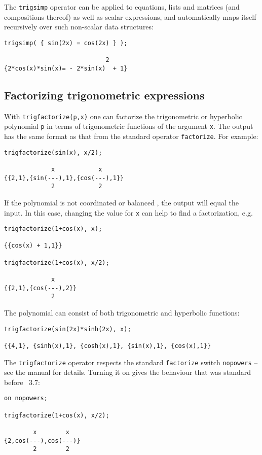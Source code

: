 The \texttt{trigsimp} operator can be applied to equations, lists and
matrices (and compositions thereof) as well as scalar expressions, and
automatically maps itself recursively over such non-scalar data
structures:
\begin{verbatim}
trigsimp( { sin(2x) = cos(2x) } );

                            2
{2*cos(x)*sin(x)= - 2*sin(x)  + 1}
\end{verbatim}


\subsection{Factorizing trigonometric expressions}

With \texttt{trigfactorize(p,x)} one can factorize the trigonometric
or hyperbolic polynomial \texttt{p} in terms of trigonometric
functions of the argument \texttt{x}.  The output has the same format
as that from the standard \REDUCE{} operator \texttt{factorize}.  For
example:
\begin{verbatim}
trigfactorize(sin(x), x/2);

             x            x
{{2,1},{sin(---),1},{cos(---),1}}
             2            2
\end{verbatim}
If the polynomial is not coordinated or balanced \cite{art}, the
output will equal the input.  In this case, changing the value for
\texttt{x} can help to find a factorization, e.g.
\begin{verbatim}
trigfactorize(1+cos(x), x);

{{cos(x) + 1,1}}

trigfactorize(1+cos(x), x/2);

             x
{{2,1},{cos(---),2}}
             2
\end{verbatim}
The polynomial can consist of both trigonometric and hyperbolic functions:
\begin{verbatim}
trigfactorize(sin(2x)*sinh(2x), x);

{{4,1}, {sinh(x),1}, {cosh(x),1}, {sin(x),1}, {cos(x),1}}
\end{verbatim}

The \texttt{trigfactorize} operator respects the standard \REDUCE{}
\texttt{factorize} switch \texttt{nopowers} -- see the \REDUCE{}
manual for details.  Turning it on gives the behaviour that was
standard before \REDUCE~3.7:
\begin{verbatim}
on nopowers;

trigfactorize(1+cos(x), x/2);

        x        x
{2,cos(---),cos(---)}
        2        2
\end{verbatim}


